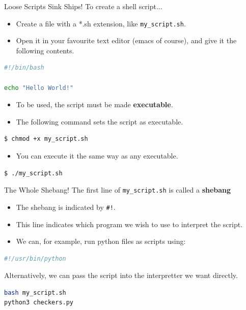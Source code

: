 \documentclass[11pt]{beamer}
\begin{document}

\begin{frame}[fragile=singleslide]{Loose Scripts Sink Ships!}
To create a shell script... 
\begin{itemize}
\item Create a file with a *.sh extension, like \texttt{my\_script.sh}.
\item Open it in your favourite text editor (emacs of course), and give it the following contents.
\end{itemize}
\begin{lstlisting}[style=terminal, language=bash]
#!/bin/bash

echo "Hello World!"
\end{lstlisting}
\begin{itemize}
\item To be used, the script must be made \textbf{executable}.
\item The following command sets the script as executable.
\end{itemize}
\begin{lstlisting}[style=terminal, language=bash]
$ chmod +x my_script.sh
\end{lstlisting}
\begin{itemize}
\item You can execute it the same way as any executable.
\end{itemize}
\begin{lstlisting}[style=terminal, language=bash]
$ ./my_script.sh
\end{lstlisting}
\end{frame}

\begin{frame}[fragile=singleslide]{The Whole Shebang!}
The first line of \texttt{my\_script.sh} is called a \textbf{shebang} 
\begin{itemize}
\item The shebang is indicated by \texttt{\#!}.
\item This line indicates which program we wish to use to interpret the script.  
\item We can, for example, run python files as scripts using:
\end{itemize}
\begin{lstlisting}[style=terminal, language=bash]
#!/usr/bin/python
\end{lstlisting}
Alternatively, we can pass the script into the interpretter we want directly.   
\begin{lstlisting}[style=terminal, language=bash]
bash my_script.sh
python3 checkers.py
\end{lstlisting}
\end{frame}
\end{document}
